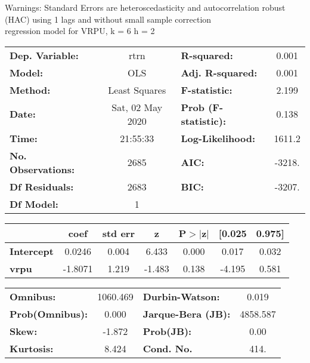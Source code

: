 Warnings: \newline
 [1] Standard Errors are heteroscedasticity and autocorrelation robust (HAC) using 1 lags and without small sample correction\\ 

regression model for VRPU, k = 6 h = 2\begin{center}
\begin{tabular}{lclc}
\toprule
\textbf{Dep. Variable:}    &       rtrn       & \textbf{  R-squared:         } &     0.001   \\
\textbf{Model:}            &       OLS        & \textbf{  Adj. R-squared:    } &     0.001   \\
\textbf{Method:}           &  Least Squares   & \textbf{  F-statistic:       } &     2.199   \\
\textbf{Date:}             & Sat, 02 May 2020 & \textbf{  Prob (F-statistic):} &    0.138    \\
\textbf{Time:}             &     21:55:33     & \textbf{  Log-Likelihood:    } &    1611.2   \\
\textbf{No. Observations:} &        2685      & \textbf{  AIC:               } &    -3218.   \\
\textbf{Df Residuals:}     &        2683      & \textbf{  BIC:               } &    -3207.   \\
\textbf{Df Model:}         &           1      & \textbf{                     } &             \\
\bottomrule
\end{tabular}
\begin{tabular}{lcccccc}
                   & \textbf{coef} & \textbf{std err} & \textbf{z} & \textbf{P$> |$z$|$} & \textbf{[0.025} & \textbf{0.975]}  \\
\midrule
\textbf{Intercept} &       0.0246  &        0.004     &     6.433  &         0.000        &        0.017    &        0.032     \\
\textbf{vrpu}      &      -1.8071  &        1.219     &    -1.483  &         0.138        &       -4.195    &        0.581     \\
\bottomrule
\end{tabular}
\begin{tabular}{lclc}
\textbf{Omnibus:}       & 1060.469 & \textbf{  Durbin-Watson:     } &    0.019  \\
\textbf{Prob(Omnibus):} &   0.000  & \textbf{  Jarque-Bera (JB):  } & 4858.587  \\
\textbf{Skew:}          &  -1.872  & \textbf{  Prob(JB):          } &     0.00  \\
\textbf{Kurtosis:}      &   8.424  & \textbf{  Cond. No.          } &     414.  \\
\bottomrule
\end{tabular}
\end{center}

